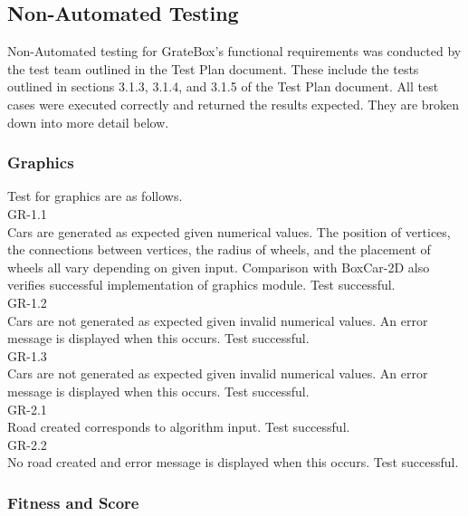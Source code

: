 \documentclass[12pt, titlepage]{article}
\begin{document}
\subsection{Non-Automated Testing}

Non-Automated testing for GrateBox's functional requirements was conducted by the test team outlined in the Test Plan document. These include the tests outlined in sections 3.1.3, 3.1.4, and 3.1.5 of the Test Plan document. All test cases were executed correctly and returned the results expected. They are broken down into more detail below.

\subsubsection{Graphics}

Test for graphics are as follows.\\

GR-1.1\\

Cars are generated as expected given numerical values. The position of vertices, the connections between vertices, the radius of wheels, and the placement of wheels all vary depending on given input. Comparison with BoxCar-2D also verifies successful implementation of graphics module. Test successful.\\

GR-1.2\\

Cars are not generated as expected given invalid numerical values. An error message is displayed when this occurs. Test successful.\\

GR-1.3\\

Cars are not generated as expected given invalid numerical values. An error message is displayed when this occurs. Test successful.\\

GR-2.1\\

Road created corresponds to algorithm input. Test successful.\\

GR-2.2\\

No road created and error message is displayed when this occurs. Test successful.

\subsubsection{Fitness and Score}
\end{document}

